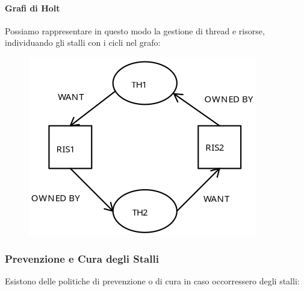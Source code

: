 \documentclass{article}
\begin{document}
\paragraph{Grafi di Holt} Possiamo rappresentare in questo modo la gestione di thread e risorse, individuando gli stalli con i cicli nel grafo:

\begin{figure}[htbp]
    \center
    \includegraphics[scale=0.325]{img/grafoHolt.png}
\end{figure}

\subsubsection{Prevenzione e Cura degli Stalli}

Esistono delle politiche di prevenzione o di cura in caso occorressero degli stalli:
\end{document}
